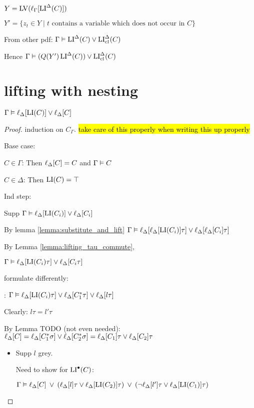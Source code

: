 \documentclass[,%
	draft=false,%
	numbers=noendperiod
	11pt,
	a4paper,
	oneside,%
	openany,
]{memoir}
\begin{document}
$Y = \operatorname{LV}( \ell_{\Gamma}[\operatorname{LI}^\Delta(C)])$

$Y' = \{ z_t \in Y \mid t\text{ contains a variable which does not occur in $C$} \}$

From other pdf: $\Gamma \vDash \operatorname{LI}^\Delta(C) \lor \operatorname{LI}_{\operatorname{cl}}^\Delta(C)$

Hence $\Gamma \vDash (Q(Y') \operatorname{LI}^\Delta(C)) \lor \operatorname{LI}_{\operatorname{cl}}^\Delta(C)$

\section{lifting with nesting}

\begin{clemma}
	$\Gamma \vDash \ell_{\Delta}[\operatorname{LI}(C)] \lor \ell_{\Delta}[C]$
\end{clemma}
\begin{proof}
	induction on $C_\Gamma$. \hl{take care of this properly when writing this up properly}

	Base case:

	$C\in \Gamma$: Then $\ell_{\Delta}[C] = C$ and $\Gamma \vDash C$

	$C \in \Delta$: Then $\operatorname{LI}(C) = \top$ 

	Ind step:

	Supp
	$\Gamma \vDash \ell_{\Delta}[\operatorname{LI}(C_i)] \lor \ell_{\Delta}[C_i]$

	By lemma \ref{lemma:substitute_and_lift}
	$\Gamma \vDash \ell_{\Delta}[\ell_{\Delta}[\operatorname{LI}(C_i)]\tau] \lor \ell_{\Delta}[\ell_{\Delta}[C_i]\tau]$

	By Lemma \ref{lemma:lifting_tau_commute},

	$\Gamma \vDash \ell_{\Delta}[\operatorname{LI}(C_i)\tau] \lor \ell_{\Delta}[C_i\tau]$

	formulate differently:

	\markA\markB:
	$\Gamma \vDash \ell_{\Delta}[\operatorname{LI}(C_i)\tau] \lor
	\ell_{\Delta}[C_1^*\tau] \lor
	\ell_{\Delta}[l\tau]$


	Clearly: $l\tau = l'\tau$

	By Lemma TODO (not even needed):
	$\ell_{\Delta}[C] = \ell_{\Delta}[C_1^*\sigma] \lor \ell_{\Delta}[C_2^*\sigma] = \ell_{\Delta}[C_1]\tau \lor \ell_{\Delta}[C_2]\tau$


	\begin{itemize}
		\item Supp $l$ grey.

			Need to show for $\operatorname{LI}^\bullet(C)$:

			$\Gamma \vDash \ell_{\Delta}[C]
			\;\,{\lor}\;\, (\ell_{\Delta}[l]\tau \lor \ell_{\Delta}[\operatorname{LI}(C_2)]\tau) 
			\;\,{\lor}\;\, (\lnot\ell_{\Delta}[l']\tau \lor \ell_{\Delta}[\operatorname{LI}(C_1)]\tau)$


\end{itemize}
\end{proof}
\end{document}
